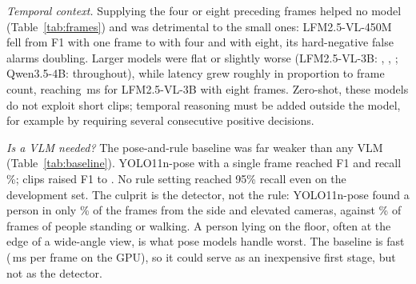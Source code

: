 \begin{table}[t]
\centering
\caption{Precision and input resolution (test set, prompt~A, one frame, calibrated operating point). p95 latency and peak RSS on the integrated GPU; the last column is the median prompt length in tokens, almost all of it image tokens.}
\label{tab:grid}
\footnotesize
\setlength{\tabcolsep}{4pt}
\end{table}

\textit{Temporal context.} Supplying the four or eight preceding frames helped no model (Table~\ref{tab:frames}) and was detrimental to the small ones: LFM2.5-VL-450M fell from F1 \CLfmSQeightNatOneFone{} with one frame to \CLfmSQeightNatFourFone{} with four and \CLfmSQeightNatEightFone{} with eight, its hard-negative false alarms doubling. Larger models were flat or slightly worse (LFM2.5-VL-3B: \CLfmLQeightNatOneFone, \CLfmLQeightNatFourFone, \CLfmLQeightNatEightFone; Qwen3.5-4B: \CQwenLQeightNatOneFone{} throughout), while latency grew roughly in proportion to frame count, reaching \CLfmLQeightNatEightPtf\,ms for LFM2.5-VL-3B with eight frames. Zero-shot, these models do not exploit short clips; temporal reasoning must be added outside the model, for example by requiring several consecutive positive decisions.


\textit{Is a VLM needed?} The pose-and-rule baseline was far weaker than any VLM (Table~\ref{tab:baseline}). YOLO11n-pose with a single frame reached F1 \CPoseNPoseNatOneFone{} and recall \CPoseNPoseNatOneDefRecall\%; clips raised F1 to \CPoseNPoseNatFourFone. No rule setting reached 95\% recall even on the development set. The culprit is the detector, not the rule: YOLO11n-pose found a person in only \RPoseDetDown\% of the \pd{} frames from the side and elevated cameras, against \RPoseDetNormal\% of frames of people standing or walking. A person lying on the floor, often at the edge of a wide-angle view, is what pose models handle worst. The baseline is fast (\RPoseNMs\,ms per frame on the GPU), so it could serve as an inexpensive first stage, but not as the detector.

